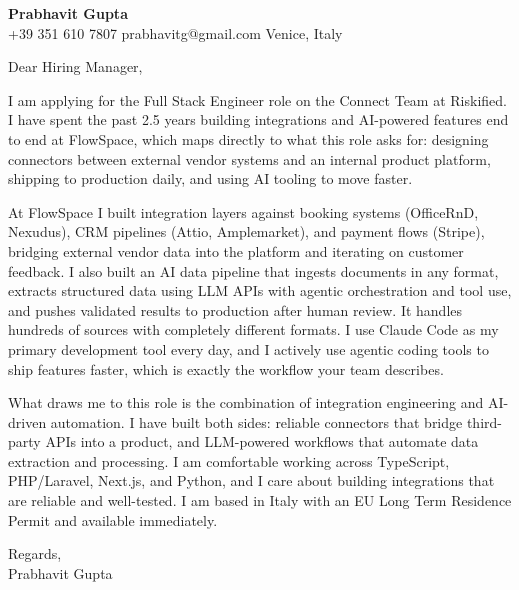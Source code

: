 \documentclass[a4paper,11pt]{letter}
\begin{document}
{\large\bfseries Prabhavit Gupta}\\[2pt]
{\small +39 351 610 7807 \quad prabhavitg@gmail.com \quad Venice, Italy}

\vspace{16pt}

Dear Hiring Manager,

I am applying for the Full Stack Engineer role on the Connect Team at Riskified. I have spent the past 2.5 years building integrations and AI-powered features end to end at FlowSpace, which maps directly to what this role asks for: designing connectors between external vendor systems and an internal product platform, shipping to production daily, and using AI tooling to move faster.

At FlowSpace I built integration layers against booking systems (OfficeRnD, Nexudus), CRM pipelines (Attio, Amplemarket), and payment flows (Stripe), bridging external vendor data into the platform and iterating on customer feedback. I also built an AI data pipeline that ingests documents in any format, extracts structured data using LLM APIs with agentic orchestration and tool use, and pushes validated results to production after human review. It handles hundreds of sources with completely different formats. I use Claude Code as my primary development tool every day, and I actively use agentic coding tools to ship features faster, which is exactly the workflow your team describes.

What draws me to this role is the combination of integration engineering and AI-driven automation. I have built both sides: reliable connectors that bridge third-party APIs into a product, and LLM-powered workflows that automate data extraction and processing. I am comfortable working across TypeScript, PHP/Laravel, Next.js, and Python, and I care about building integrations that are reliable and well-tested. I am based in Italy with an EU Long Term Residence Permit and available immediately.

Regards,\\
Prabhavit Gupta
\end{document}
